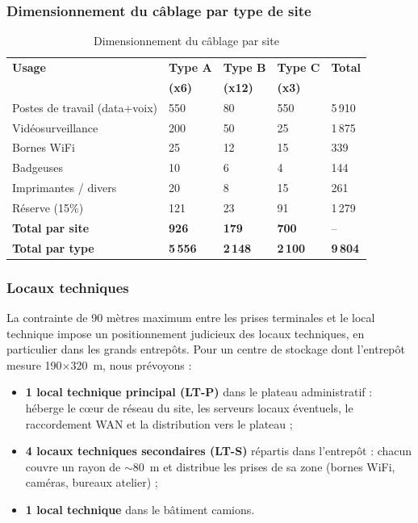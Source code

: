 \documentclass[12pt,a4paper]{report}
\begin{document}
\subsubsection{Dimensionnement du câblage par type de site}

\begin{table}[H]
\centering
\small
\begin{tabularx}{\textwidth}{L{4cm}C{1.5cm}C{1.5cm}C{1.5cm}R{2cm}}
\toprule
\textbf{Usage} & \textbf{Type A} & \textbf{Type B} & \textbf{Type C} & \textbf{Total} \\
& \textbf{(x6)} & \textbf{(x12)} & \textbf{(x3)} & \\
\midrule
Postes de travail (data+voix) & 550 & 80 & 550 & 5\,910 \\
Vidéosurveillance & 200 & 50 & 25 & 1\,875 \\
Bornes WiFi & 25 & 12 & 15 & 339 \\
Badgeuses & 10 & 6 & 4 & 144 \\
Imprimantes / divers & 20 & 8 & 15 & 261 \\
Réserve (15\%) & 121 & 23 & 91 & 1\,279 \\
\midrule
\textbf{Total par site} & \textbf{926} & \textbf{179} & \textbf{700} & -- \\
\textbf{Total par type} & \textbf{5\,556} & \textbf{2\,148} & \textbf{2\,100} & \textbf{9\,804} \\
\bottomrule
\end{tabularx}
\caption{Dimensionnement du câblage par site}
\label{tab:cablage}
\end{table}

\subsubsection{Locaux techniques}

La contrainte de 90 mètres maximum entre les prises terminales et le local technique impose un positionnement judicieux des locaux techniques, en particulier dans les grands entrepôts. Pour un centre de stockage dont l'entrepôt mesure 190$\times$320~m, nous prévoyons :

\begin{itemize}
\item \textbf{1 local technique principal (LT-P)} dans le plateau administratif : héberge le c\oe ur de réseau du site, les serveurs locaux éventuels, le raccordement WAN et la distribution vers le plateau ;
\item \textbf{4 locaux techniques secondaires (LT-S)} répartis dans l'entrepôt : chacun couvre un rayon de $\sim$80~m et distribue les prises de sa zone (bornes WiFi, caméras, bureaux atelier) ;
\item \textbf{1 local technique} dans le bâtiment camions.
\end{itemize}
\end{document}
